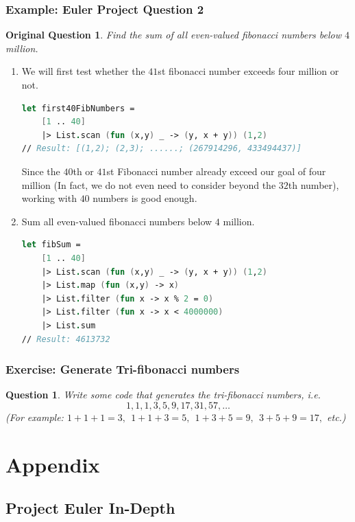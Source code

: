 \documentclass[12pt]{article}
\newtheorem*{question*}{Question}
\newtheorem*{origQuestion*}{Original Question}
\begin{document}
\subsubsection*{Example: Euler Project Question 2}
\begin{origQuestion*}
Find the sum of all even-valued fibonacci numbers below $4$ million.
\end{origQuestion*}
\begin{enumerate}
\item We will first test whether the $41$st fibonacci number exceeds four million or not.
\begin{lstlisting}[language=FSharp]
let first40FibNumbers =
    [1 .. 40]
    |> List.scan (fun (x,y) _ -> (y, x + y)) (1,2)
// Result: [(1,2); (2,3); ......; (267914296, 433494437)]
\end{lstlisting}
Since the $40$th or $41$st Fibonacci number already exceed our goal of four million (In fact, we do not even need to consider beyond the $32$th number), working with $40$ numbers is good enough.
\item Sum all even-valued fibonacci numbers below $4$ million.
\begin{lstlisting}[language=FSharp]
let fibSum =
    [1 .. 40]
    |> List.scan (fun (x,y) _ -> (y, x + y)) (1,2)
    |> List.map (fun (x,y) -> x)
    |> List.filter (fun x -> x % 2 = 0)
    |> List.filter (fun x -> x < 4000000)
    |> List.sum
// Result: 4613732
\end{lstlisting}
\end{enumerate}

\subsubsection*{Exercise: Generate Tri-fibonacci numbers}
\begin{question*}
Write some code that generates the tri-fibonacci numbers, i.e.
\[
1, 1, 1, 3, 5, 9, 17, 31, 57, \ldots
\]
(For example: $1 + 1 + 1 = 3, \:\:1 + 1 + 3 = 5, \:\: 1 + 3 + 5 = 9,  \:\:3 + 5 + 9 = 17,$ etc.)
\end{question*}
\pagebreak

\appendix
\section{Appendix}


\subsection{Project Euler In-Depth}
\end{document}
